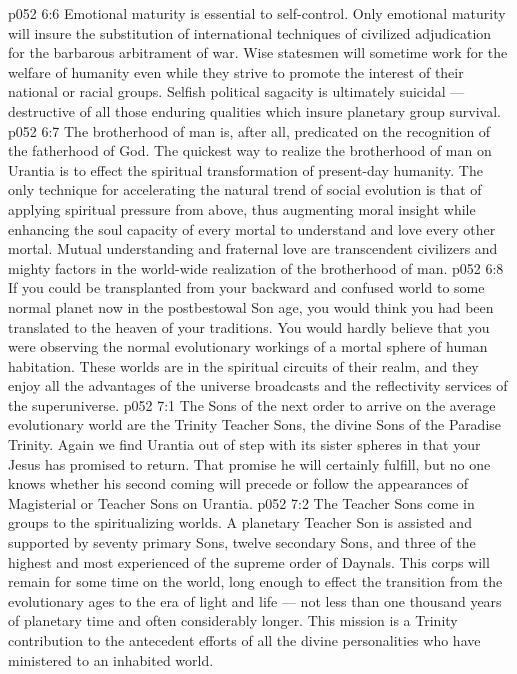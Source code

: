 \vs p052 6:6 \pc {}\bibnobreakspace {} Emotional maturity is essential to self\hyp{}control. Only emotional maturity will insure the substitution of international techniques of civilized adjudication for the barbarous arbitrament of war. Wise statesmen will sometime work for the welfare of humanity even while they strive to promote the interest of their national or racial groups. Selfish political sagacity is ultimately suicidal --- destructive of all those enduring qualities which insure planetary group survival.
\vs p052 6:7 \pc {}\bibnobreakspace {} The brotherhood of man is, after all, predicated on the recognition of the fatherhood of God. The quickest way to realize the brotherhood of man on Urantia is to effect the spiritual transformation of present\hyp{}day humanity. The only technique for accelerating the natural trend of social evolution is that of applying spiritual pressure from above, thus augmenting moral insight while enhancing the soul capacity of every mortal to understand and love every other mortal. Mutual understanding and fraternal love are transcendent civilizers and mighty factors in the world\hyp{}wide realization of the brotherhood of man.
\vs p052 6:8 \pc If you could be transplanted from your backward and confused world to some normal planet now in the postbestowal Son age, you would think you had been translated to the heaven of your traditions. You would hardly believe that you were observing the normal evolutionary workings of a mortal sphere of human habitation. These worlds are in the spiritual circuits of their realm, and they enjoy all the advantages of the universe broadcasts and the reflectivity services of the superuniverse.
\vs p052 7:1 The Sons of the next order to arrive on the average evolutionary world are the Trinity Teacher Sons, the divine Sons of the Paradise Trinity. Again we find Urantia out of step with its sister spheres in that your Jesus has promised to return. That promise he will certainly fulfill, but no one knows whether his second coming will precede or follow the appearances of Magisterial or Teacher Sons on Urantia.
\vs p052 7:2 The Teacher Sons come in groups to the spiritualizing worlds. A planetary Teacher Son is assisted and supported by seventy primary Sons, twelve secondary Sons, and three of the highest and most experienced of the supreme order of Daynals. This corps will remain for some time on the world, long enough to effect the transition from the evolutionary ages to the era of light and life --- not less than one thousand years of planetary time and often considerably longer. This mission is a Trinity contribution to the antecedent efforts of all the divine personalities who have ministered to an inhabited world.
